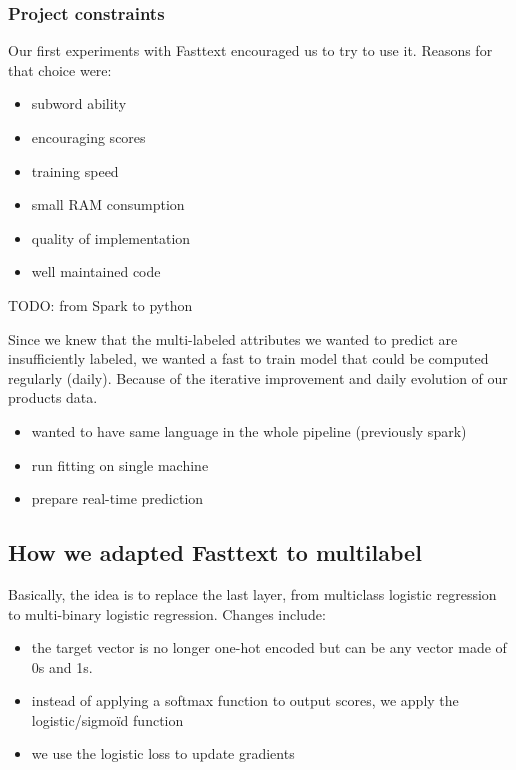 \subsubsection{Project constraints}


Our first experiments with Fasttext encouraged us to try to use it. Reasons for that choice were:
\begin{itemize}
	\item subword ability
	\item encouraging scores
	\item training speed
	\item small RAM consumption
	\item quality of implementation
	\item well maintained code
\end{itemize}

TODO: from Spark to python

Since we knew that the multi-labeled attributes we wanted to predict are insufficiently labeled, we wanted a fast to train model that could be computed regularly (daily). Because of the iterative improvement and daily evolution of our products data. 

\begin{itemize}
	\item wanted to have same language in the whole pipeline (previously spark)
	\item run fitting on single machine
	\item prepare real-time prediction

\end{itemize}

\subsection{How we adapted Fasttext to multilabel}

Basically, the idea is to replace the last layer, from multiclass logistic regression to multi-binary logistic regression. Changes include:

\begin{itemize}
	\item the target vector is no longer one-hot encoded but can be any vector made of 0s and 1s.
	\item instead of applying a softmax function to output scores, we apply the logistic/sigmoïd function
	\item we use the logistic loss to update gradients
\end{itemize}


